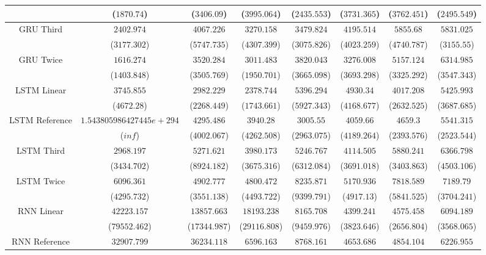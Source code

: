 \begin{table}[!ht]
{\begin{tabular}{|c|c|c|c|c|c|c|c|}
			 & ($1870.74$) & ($3406.09$) & ($3995.064$) & ($2435.553$) & ($3731.365$) & ($3762.451$) & ($2495.549$) \\ \hline
			\multirow{2}{*}{GRU Third} & $2402.974$ & $4067.226$ & $3270.158$ & $3479.824$ & $4195.514$ & $5855.68$ & $5831.025$ \\
			 & ($3177.302$) & ($5747.735$) & ($4307.399$) & ($3075.826$) & ($4023.259$) & ($4740.787$) & ($3155.55$) \\ \hline
			\multirow{2}{*}{GRU Twice} & $1616.274$ & $3520.284$ & $3011.483$ & $3820.043$ & $3276.008$ & $5157.124$ & $6314.985$ \\
			 & ($1403.848$) & ($3505.769$) & ($1950.701$) & ($3665.098$) & ($3693.298$) & ($3325.292$) & ($3547.343$) \\ \hline
			\multirow{2}{*}{LSTM Linear} & $3745.855$ & $2982.229$ & $2378.744$ & $5396.294$ & $4930.34$ & $4017.208$ & $5425.993$ \\
			 & ($4672.28$) & ($2268.449$) & ($1743.661$) & ($5927.343$) & ($4168.677$) & ($2632.525$) & ($3687.685$) \\ \hline
			\multirow{2}{*}{LSTM Reference} & $1.543805986427445e+294$ & $4295.486$ & $3940.28$ & $3005.55$ & $4059.66$ & $4659.3$ & $5541.315$ \\
			 & ($inf$) & ($4002.067$) & ($4262.508$) & ($2963.075$) & ($4189.264$) & ($2393.576$) & ($2523.544$) \\ \hline
			\multirow{2}{*}{LSTM Third} & $2968.197$ & $5271.621$ & $3980.173$ & $5246.767$ & $4114.505$ & $5880.241$ & $6366.798$ \\
			 & ($3434.702$) & ($8924.182$) & ($3675.316$) & ($6312.084$) & ($3691.018$) & ($3403.863$) & ($4503.106$) \\ \hline
			\multirow{2}{*}{LSTM Twice} & $6096.361$ & $4902.777$ & $4800.472$ & $8235.871$ & $5170.936$ & $7818.589$ & $7189.79$ \\
			 & ($4295.732$) & ($3551.138$) & ($4493.722$) & ($9399.791$) & ($4917.13$) & ($5841.525$) & ($3704.241$) \\ \hline
			\multirow{2}{*}{RNN Linear} & $42223.157$ & $13857.663$ & $18193.238$ & $8165.708$ & $4399.241$ & $4575.458$ & $6094.189$ \\
			 & ($79552.462$) & ($17344.987$) & ($29116.808$) & ($9459.976$) & ($3823.646$) & ($2656.804$) & ($3568.065$) \\ \hline
			\multirow{2}{*}{RNN Reference} & $32907.799$ & $36234.118$ & $6596.163$ & $8768.161$ & $4653.686$ & $4854.104$ & $6226.955$ \\

\end{tabular}}
\end{table}
